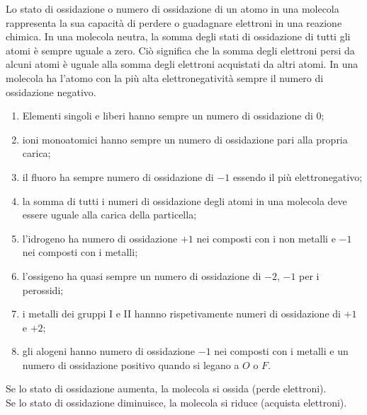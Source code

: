 \documentclass[a4paper]{article}
\begin{document}

Lo stato di ossidazione o numero di ossidazione di un atomo in una molecola rappresenta la sua capacità di perdere o guadagnare
elettroni in una reazione chimica. In una molecola neutra, la somma degli stati di ossidazione di tutti gli atomi è
sempre uguale a zero. Ciò significa che la somma degli elettroni persi da alcuni atomi è uguale alla somma
degli elettroni acquistati da altri atomi. In una molecola ha l'atomo con la più alta elettronegatività
sempre il numero di ossidazione negativo.

\begin{enumerate}
    \item Elementi singoli e liberi hanno sempre un numero di ossidazione di \(0\);
    \item ioni monoatomici hanno sempre un numero di ossidazione pari alla propria carica;
    \item il fluoro ha sempre numero di ossidazione di \(-1\) essendo il più elettronegativo;
    \item la somma di tutti i numeri di ossidazione degli atomi in una molecola deve essere
        uguale alla carica della particella;
    \item l'idrogeno ha numero di ossidazione \(+1\) nei composti con i non metalli e \(-1\)
        nei composti con i metalli;
    \item l'ossigeno ha quasi sempre un numero di ossidazione di \(-2\), \(-1\) per i perossidi;
    \item i metalli dei gruppi I e II hannno rispetivamente numeri di ossidazione di \(+1\) e \(+2\);
    \item gli alogeni hanno numero di ossidazione \(-1\) nei composti con i metalli e un numero di ossidazione
        positivo quando si legano a \(O\) o \(F\).
\end{enumerate}


Se lo stato di ossidazione aumenta, la molecola si ossida (perde elettroni). \\
Se lo stato di ossidazione diminuisce, la molecola si riduce (acquista elettroni).
\end{document}
